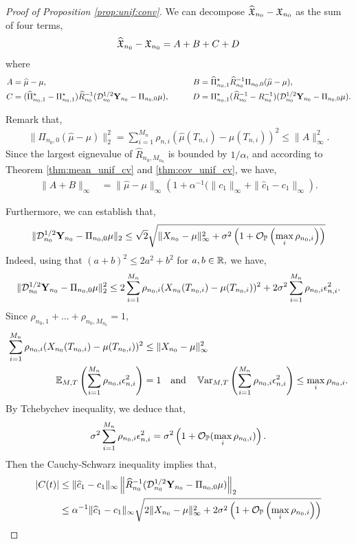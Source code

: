 \documentclass{article}
\begin{document}
\begin{proof}[Proof of Proposition \ref{prop:unif:conv}]
We can decompose $\widehat{\mathfrak{X}}_{n_0}-{\mathfrak{X}}_{n_0}$ as the sum of four terms,
$$
\widehat{\mathfrak{X}}_{n_0}-{\mathfrak{X}}_{n_0}=A+B+C+D
$$
where
\begin{align*}
A&= \widehat{\mu}-\mu,&\qquad
B&= \widehat{\Pi}_{n_0,1}^\star \widehat{R}_{n_0}^{-1} \Pi_{n_0,0}(\widehat{\mu}-\mu),\\
C&= (\widehat{\Pi}_{n_0,1}^\star-{\Pi}_{n_0,1}^\star) \widehat{R}_{n_0}^{-1} (\mathcal{D}^{1/2}_{n_0}\mathbf{Y}_{n_0}-\Pi_{n_0,0}\mu),&\qquad
D&= {\Pi}_{n_0,1}^\star (\widehat{R}_{n_0}^{-1}- {R}_{n_0}^{-1}) (\mathcal{D}^{1/2}_{n_0}\mathbf{Y}_{n_0}-\Pi_{n_0,0}\mu).
\end{align*}

\medskip

Remark that,
\begin{align*}
\|\Pi_{n_0,0}(\widehat{\mu}-\mu)\|_2^2= \sum_{i=1}^{M_n}\rho_{n,i}\left(\widehat{\mu}(T_{n,i})-{\mu}(T_{n,i})\right)^2 \leq \|A\|_\infty^2.
\end{align*}
Since the largest eignevalue of $\widehat{R}_{n_0,M_{n_0}}$  is bounded by $1/\alpha$, and according to Theorem \ref{thm:mean_unif_cv} and \ref{thm:cov_unif_cv}, we have,
\begin{align*}
\|A+B\|_\infty&= \|\widehat{\mu}-\mu\|_\infty \left(1 + \alpha^{-1}(\|c_1\|_\infty + \|\widehat{c}_1-c_1\|_\infty\right).
\end{align*}

\medskip

Furthermore, we can establish that,
$$
\|\mathcal{D}^{1/2}_{n_0}\mathbf{Y}_{n_0}-\Pi_{n_0,0}\mu\|_2 \leq \sqrt{2}\sqrt{\|X_{n_0}-\mu\|_\infty^2 +\sigma^2 \left(1 + \mathcal{O}_{\mathbb{P}}\left(\max_{i}\rho_{n_0,i}\right)\right)}
$$ 
Indeed, using that $(a+b)^2\leq 2 a^2+b^2$ for $a,b\in\mathbb{R},$ we have,
\begin{align*}
\|\mathcal{D}^{1/2}_{n_0}\mathbf{Y}_{n_0}-\Pi_{n_0,0}\mu\|_2^2 \leq 2 \sum_{i=1}^{M_n}\rho_{n_0,i}(X_{n_0}(T_{n_0,i})-\mu(T_{n_0,i}))^2 + 2\sigma^2\sum_{i=1}^{M_n} \rho_{n_0,i}\epsilon_{n,i}^2. 
\end{align*}
Since $\rho_{n_0,1}+\ldots+\rho_{n_0,M_{n_0}}=1,$
\begin{align*}
\sum_{i=1}^{M_n}\rho_{n_0,i}(X_{n_0}(T_{n_0,i})-\mu(T_{n_0,i}))^2 &\leq \|X_{n_0}-\mu\|_\infty^2\\ 
\mathbb{E}_{M,T}\left(\sum_{i=1}^{M_n} \rho_{n_0,i}\epsilon_{n,i}^2\right)&=1 \quad\text{and}\quad
\operatorname{\mathbb{V}ar}_{M,T}\left(\sum_{i=1}^{M_n} \rho_{n_0,i}\epsilon_{n,i}^2 \right) \leq \max_{i} \rho_{n_0,i}.
\end{align*}
By Tchebychev inequality, we deduce that, 
$$
\sigma^2\sum_{i=1}^{M_n} \rho_{n_0,i}\epsilon_{n,i}^2 =\sigma^2\left(1 + \mathcal{O}_{\mathbb{P}}(\max_{i} \rho_{n_0,i})\right).
$$
Then the Cauchy-Schwarz inequality implies that,
\begin{align*}
|C(t)| &\leq \|\widehat{c}_1-c_1\|_{\infty}\left\| \widehat{R}_{n_0}^{-1} (\mathcal{D}^{1/2}_{n_0}\mathbf{Y}_{n_0}-\Pi_{n_0,0}\mu) \right\|_2\\
	  &\leq  \alpha^{-1}\|\widehat{c}_1-c_1\|_{\infty} \sqrt{2\|X_{n_0}-\mu\|_\infty^2 +2\sigma^2 \left(1 + \mathcal{O}_{\mathbb{P}}\left(\max_{i}\rho_{n_0,i}\right)\right)} 
\end{align*}


\end{proof}
\end{document}
